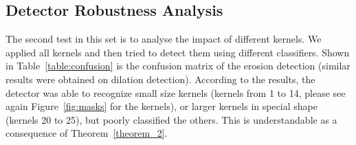\documentclass[review]{elsarticle}
\begin{document}
\begin{table}[t!]
	\centering
	\caption{Morphological filtering detection results on all three datasets  using SVM with RBF kernel, 10-fold cross validation. The numbers are in percentage and each of them is the average performance (for distinguishing between pristine versus filtered images) over all 36 kernels. Detailed results are reported in Tables~\ref{table:uciderosion} - \ref{table:raisedilation}.}
	\label{table:detection_results}
\end{table}

\subsection{Detector Robustness Analysis}
\label{subsec:result_attacks}

The second test in this set is to analyse the impact of different kernels. We applied all kernels and then tried to detect them using different classifiers. Shown in Table~\ref{table:confusion} is the confusion matrix of the erosion detection (similar results were obtained on dilation detection). According to the results, the detector was able to recognize small size kernels (kernels from 1 to 14, please see again Figure~\ref{fig:masks} for the kernels), or larger kernels in special shape (kernels 20 to 25), but poorly classified the others. This is understandable as a consequence of Theorem~\ref{theorem_2}.
\end{document}
